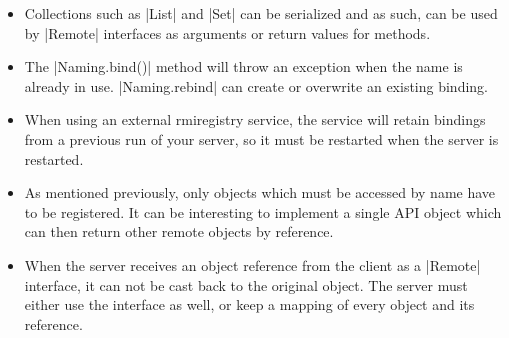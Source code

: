 \documentclass[a4paper]{article}
\begin{document}
\begin{itemize}
\item Collections such as |List| and |Set| can be serialized and as such, can be used by |Remote| interfaces as arguments or return values for methods.
\item The |Naming.bind()| method will throw an exception when the name is already in use. |Naming.rebind| can create or overwrite an existing binding.
\item When using an external rmiregistry service, the service will retain bindings from a previous run of your server, so it must be restarted when the server is restarted.
\item As mentioned previously, only objects which must be accessed by name have to be registered. It can be interesting to implement a single API object which can then return other remote objects by reference.
\item When the server receives an object reference from the client as a |Remote| interface, it can not be cast back to the original object. The server must either use the interface as well, or keep a mapping of every object and its reference.
\end{itemize}
\end{document}
